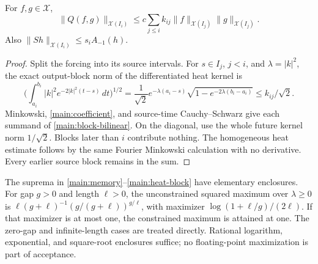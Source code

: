 \begin{lemma}
\label{main:block-lemma}
For $f,g\in\mathcal X$,
\begin{equation}
 \|Q(f,g)\|_{\mathcal X(I_i)}
 \le c\sum_{j\le i}k_{ij}
       \|f\|_{\mathcal X(I_j)}\|g\|_{\mathcal X(I_j)}.
 \label{main:block-bilinear}
\end{equation}
Also $\|Sh\|_{\mathcal X(I_i)}\le s_i A_{-1}(h)$.
\end{lemma}
\begin{proof}
Split the forcing into its source intervals. For $s\in I_j$, $j<i$, and
$\lambda=|k|^2$, the exact output-block norm of the differentiated heat
kernel is
\[
 \bigg(\int_{a_i}^{b_i}|k|^2e^{-2|k|^2(t-s)}\,dt\bigg)^{1/2}
 =\frac1{\sqrt2}e^{-\lambda(a_i-s)}
       \sqrt{1-e^{-2\lambda(b_i-a_i)}}\le k_{ij}/\sqrt2.
\]
Minkowski, \eqref{main:coefficient}, and source-time Cauchy--Schwarz give
each summand of \eqref{main:block-bilinear}. On the diagonal, use the whole
future kernel norm $1/\sqrt2$. Blocks later than $i$ contribute nothing.
The homogeneous heat estimate follows by the same Fourier Minkowski
calculation with no derivative. Every earlier source block remains in the sum.
\end{proof}

The suprema in \eqref{main:memory}--\eqref{main:heat-block} have elementary
enclosures. For gap $g>0$ and length $\ell>0$, the unconstrained squared
maximum over $\lambda\ge0$ is
$\ell(g+\ell)^{-1}(g/(g+\ell))^{g/\ell}$, with maximizer
$\log(1+\ell/g)/(2\ell)$. If that maximizer is at most one, the
constrained maximum is attained at one. The zero-gap and infinite-length
cases are treated directly. Rational logarithm, exponential, and square-root
enclosures suffice; no floating-point maximization is part of acceptance.

